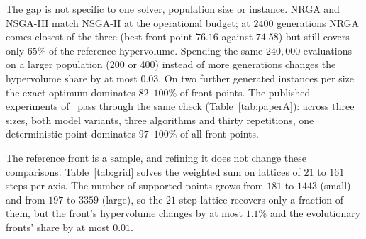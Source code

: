 \documentclass[systems,article,submit,moreauthors,pdftex]{Definitions/mdpi}
\begin{document}
The gap is not specific to one solver, population size or instance. NRGA and NSGA-III
match NSGA-II at the operational budget; at $2400$ generations NRGA comes closest of the
three (best front point $76.16$ against $74.58$) but still covers only $65\%$ of the reference
hypervolume. Spending the same $240{,}000$ evaluations on a larger population (200 or 400)
instead of more generations changes the hypervolume share by at most $0.03$. On two further
generated instances per size the exact optimum dominates $82$--$100\%$ of front points.
The published experiments of~\cite{rabiei2026resilient} pass through the same check
(Table~\ref{tab:paperA}): across three sizes, both model variants, three algorithms and
thirty repetitions, one deterministic point dominates $97$--$100\%$ of all front points.

The reference front is a sample, and refining it does not change these comparisons.
Table~\ref{tab:grid} solves the weighted sum on lattices of $21$ to $161$ steps per axis. The
number of supported points grows from $181$ to $1443$ (small) and from $197$ to $3359$ (large),
so the $21$-step lattice recovers only a fraction of them, but the front's hypervolume changes
by at most $1.1\%$ and the evolutionary fronts' share by at most $0.01$.
\end{document}
